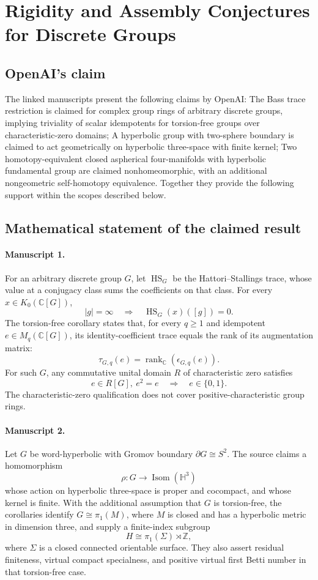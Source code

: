 \documentclass[11pt]{article}
\begin{document}
\section*{Rigidity and Assembly Conjectures for Discrete Groups}

\subsection{OpenAI's claim}
The linked manuscripts present the following claims by OpenAI: The Bass trace restriction is claimed for complex group rings of arbitrary discrete groups, implying triviality of scalar idempotents for torsion-free groups over characteristic-zero domains; A hyperbolic group with two-sphere boundary is claimed to act geometrically on hyperbolic three-space with finite kernel; Two homotopy-equivalent closed aspherical four-manifolds with hyperbolic fundamental group are claimed nonhomeomorphic, with an additional nongeometric self-homotopy equivalence. Together they provide the following support within the scopes described below.

\subsection{Mathematical statement of the claimed result}
\paragraph{Manuscript 1.}
For an arbitrary discrete group \(G\), let \(\operatorname{HS}_G\) be the Hattori--Stallings trace, whose value at a conjugacy class sums the coefficients on that class. For every \(x\in K_0(\mathbb C[G])\),
\[
 |g|=\infty\quad\Longrightarrow\quad\operatorname{HS}_G(x)([g])=0.
\]
The torsion-free corollary states that, for every \(q\ge1\) and idempotent \(e\in M_q(\mathbb C[G])\), its identity-coefficient trace equals the rank of its augmentation matrix:
\[
 \tau_{G,q}(e)=\operatorname{rank}_{\mathbb C}(\epsilon_{G,q}(e)).
\]
For such \(G\), any commutative unital domain \(R\) of characteristic zero satisfies
\[
 e\in R[G],\ e^2=e\quad\Longrightarrow\quad e\in\{0,1\}.
\]
The characteristic-zero qualification does not cover positive-characteristic group rings.

\paragraph{Manuscript 2.}
Let \(G\) be word-hyperbolic with Gromov boundary \(\partial G\cong S^2\). The source claims a homomorphism
\[
 \rho:G\longrightarrow\operatorname{Isom}(\mathbb H^3)
\]
whose action on hyperbolic three-space is proper and cocompact, and whose kernel is finite. With the additional assumption that \(G\) is torsion-free, the corollaries identify \(G\cong\pi_1(M)\), where \(M\) is closed and has a hyperbolic metric in dimension three, and supply a finite-index subgroup
\[
 H\cong\pi_1(\Sigma)\rtimes\mathbb Z,
\]
where \(\Sigma\) is a closed connected orientable surface. They also assert residual finiteness, virtual compact specialness, and positive virtual first Betti number in that torsion-free case.
\end{document}
